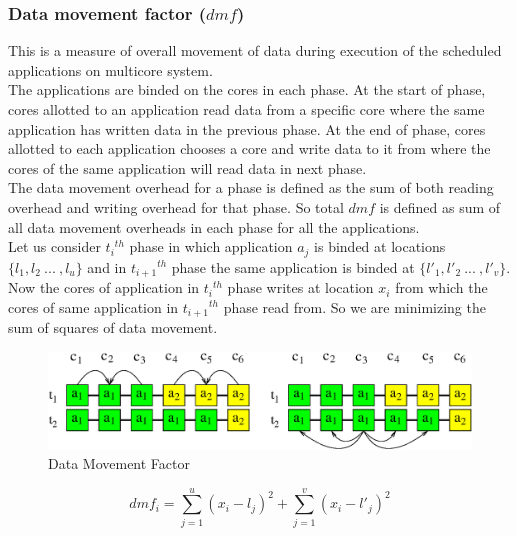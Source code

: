 \documentclass[10pt, conference]{IEEEtran}
\begin{document}
\subsubsection{Data movement factor ($dmf$)}
This is a measure of overall movement of data during execution of the scheduled applications on multicore system.\ \\
The applications are binded on the cores in each phase. At the start of phase, cores allotted to an application read data from a specific core where the same application has written data in the previous phase. At the end of phase, cores allotted to each application chooses a core and write data to it from where the cores of the same application will read data in next phase.\ \\
The data movement overhead for a phase is defined as the sum of both reading overhead and writing overhead for that phase. So total $dmf$ is defined as sum of all data movement overheads in each phase for all the applications.\ \\
Let us consider ${t_i}^{th}$ phase in which application $a_j$ is binded at locations $\{l_1,l_2\:...\:, l_u\}$ and in ${t_{i+1}}^{th}$ phase the same application is binded at $\{l'_1,l'_2\:...\:, l'_v\}$. Now the cores of application in ${t_i}^{th}$ phase writes at location $x_i$ from which the cores of same application in ${t_{i+1}}^{th}$ phase read from. So we are minimizing the sum of squares of data movement.

\begin{figure}[tb]
\centering 
\includegraphics[scale=0.5]{./figure/dmf.eps}
\vspace{0.0cm}\caption{Data Movement Factor}
\vspace{-0.1cm}
\label{dmf}
\end{figure}

\begin{equation} 
dmf_i=\sum_{j=1}^{u}(x_i-l_j)^2+\sum_{j=1}^{v} (x_i-l'_j)^2
\label{dmfeq1}
\end{equation} 
\end{document}
